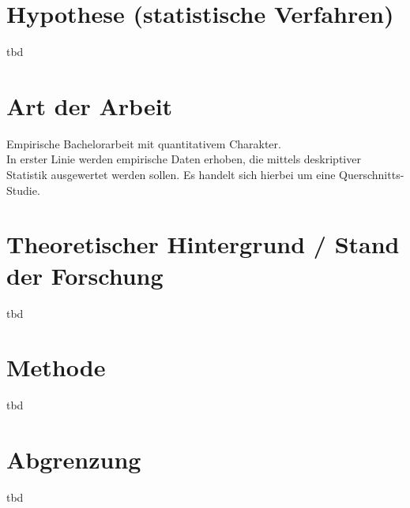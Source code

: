 \section*{Hypothese (statistische Verfahren)}\label{section.hypothesen}
tbd
\section*{Art der Arbeit}\label{section.artArbeit}
Empirische Bachelorarbeit mit quantitativem Charakter. \\
In erster Linie werden empirische Daten erhoben, die mittels deskriptiver Statistik ausgewertet werden sollen. Es handelt sich hierbei um eine Querschnitts-Studie. 
\section*{Theoretischer Hintergrund / Stand der Forschung}\label{section.forschung}
tbd
\section*{Methode}\label{section.methode}
tbd
\section*{Abgrenzung}\label{section.abgrenzung}
tbd
